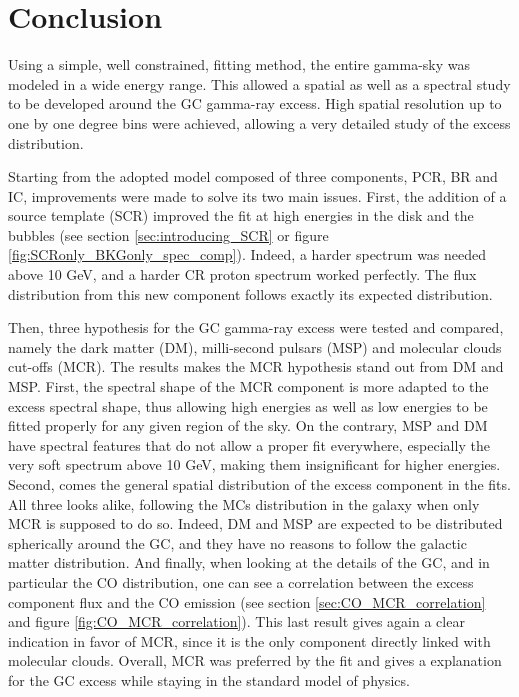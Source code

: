 \chapter{Conclusion}
\label{ch:conclusion}

%
%
%
%
%

Using a simple, well constrained, fitting method, the entire gamma-sky was modeled in a wide energy range. This allowed a spatial as well as a spectral study to be developed around the GC gamma-ray excess. High spatial resolution up to one by one degree bins were achieved, allowing a very detailed study of the excess distribution.

Starting from the adopted model composed of three components, PCR, BR and IC, improvements were made to solve its two main issues. First, the addition of a source template (SCR) improved the fit at high energies in the disk and the bubbles (see section \ref{sec:introducing_SCR} or figure \ref{fig:SCRonly_BKGonly_spec_comp}). Indeed, a harder spectrum was needed above 10 GeV, and a harder CR proton spectrum worked perfectly. The flux distribution from this new component follows exactly its expected distribution.

Then, three hypothesis for the GC gamma-ray excess were tested and compared, namely the dark matter (DM), milli-second pulsars (MSP) and molecular clouds cut-offs (MCR). The results makes the MCR hypothesis stand out from DM and MSP. First, the spectral shape of the MCR component is more adapted to the excess spectral shape, thus allowing high energies as well as low energies to be fitted properly for any given region of the sky. On the contrary, MSP and DM have spectral features that do not allow a proper fit everywhere, especially the very soft spectrum above 10 GeV, making them insignificant for higher energies. Second, comes the general spatial distribution of the excess component in the fits. All three looks alike, following the MCs distribution in the galaxy when only MCR is supposed to do so. Indeed, DM and MSP are expected to be distributed spherically around the GC, and they have no reasons to follow the galactic matter distribution. And finally, when looking at the details of the GC, and in particular the CO distribution, one can see a correlation between the excess component flux and the CO emission (see section \ref{sec:CO_MCR_correlation} and figure \ref{fig:CO_MCR_correlation}). This last result gives again a clear indication in favor of MCR, since it is the only component directly linked with molecular clouds. Overall, MCR was preferred by the fit and gives a explanation for the GC excess while staying in the standard model of physics.

